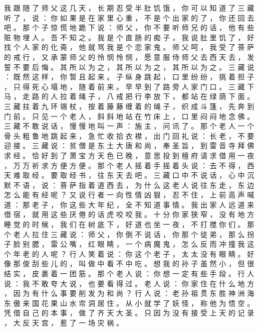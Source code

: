 {我 跟 随 了 师 父 这 几 天 ， 长 期 忍 受 半 肚 饥 饿 ， 你 可 以 知 道 了 三 藏 听 了 ， 说 ： 你 如 果 是 在 家 里 心 重 ， 不 是 个 出 家 的 了 ， 你 还 回 去 吧 。
那 个 子 惊 慌 地 跪 下 说 ： 师 父 ， 你 不 要 听 师 兄 的 话 ， 他 有 些 赃 物 埋 人 。
吾 不 知 之 。
我 是 个 直 肠 的 痴 子 ， 我 说 肚 里 饥 了 ， 好 找 个 人 家 的 化 斋 ， 他 就 骂 我 是 个 恋 家 鬼 。
师 父 呵 ， 我 受 了 菩 萨 的 戒 行 ， 又 承 蒙 师 父 的 怜 悯 怜 悯 ， 愿 意 服 侍 师 父 去 西 天 去 ， 发 誓 不 要 后 悔 。
其 所 以 为 之 ， 其 所 以 为 之 ， 其 所 以 为 之 。
三 藏 说 ： 既 然 这 样 ， 你 暂 且 起 来 。
子 纵 身 跳 起 ， 口 里 纷 纷 ， 挑 着 担 子 ， 只 得 死 心 塌 地 ， 随 着 前 来 。
早 早 到 了 路 旁 人 家 门 口 。
三 藏 下 马 ， 走 路 的 人 拉 着 绳 子 ， 八 戒 把 行 李 放 下 ， 都 站 在 绿 荫 下 面 。
三 藏 拄 着 九 环 锡 杖 ， 按 着 藤 藤 缠 着 的 绳 子 ， 织 成 斗 篷 ， 先 奔 到 门 前 。
只 见 一 个 老 人 ， 斜 斜 地 站 在 竹 床 上 ， 口 里 闷 闷 地 念 佛 。
三 藏 不 敢 说 话 ， 慢 慢 地 叫 一 声 ： 施 主 ， 问 讯 了 。
那 个 老 人 一 个 骨 头 粗 鲁 地 跳 起 来 ， 急 忙 收 拾 衣 襟 ， 出 门 回 礼 说 ： 长 老 ， 不 要 迎 接 。
三 藏 说 ： 贫 僧 是 东 土 大 唐 和 尚 ， 奉 圣 旨 ， 到 雷 音 寺 拜 佛 求 经 。
恰 好 到 了 萧 宝 方 天 色 已 晚 ， 意 思 投 到 檀 府 请 求 借 用 一 夜 ， 万 万 祈 求 方 便 方 便 。
那 个 老 人 摇 着 手 摇 着 头 说 ： 去 不 得 ， 西 天 难 取 经 。
要 取 经 书 ， 往 东 天 去 吧 。
三 藏 口 中 不 说 话 ， 心 中 沉 默 不 语 ， 说 ： 菩 萨 指 着 道 西 去 ， 为 什 么 这 老 人 说 往 东 走 ， 东 边 怎 么 能 有 经 呢 ？
又 说 行 者 一 向 性 情 凶 狠 ， 忍 不 住 ， 上 前 高 声 喊 道 ： 那 老 子 ， 你 这 些 大 年 纪 ， 全 不 知 道 事 情 。
我 出 家 人 远 道 来 借 宿 ， 就 用 这 些 厌 倦 的 话 虎 咬 咬 我 。
十 分 你 家 狭 窄 ， 没 有 地 方 睡 觉 的 时 候 ， 我 们 在 树 底 下 ， 好 道 也 坐 一 夜 ， 不 打 搅 你 们 。
那 个 老 人 拉 住 三 藏 说 ： 师 父 ， 你 倒 不 说 话 ， 你 那 个 徒 弟 ， 那 么 拐 子 脸 别 腮 ， 雷 公 嘴 ， 红 眼 睛 ， 一 个 病 魔 鬼 ， 怎 么 反 而 冲 撞 我 这 个 年 老 的 人 呢 ？ 行 人 笑 着 说 ： 你 这 个 老 子 ， 太 太 没 有 眼 睛 。
好 像 那 俊 刮 些 儿 的 ， 叫 做 中 看 不 中 吃 。
想 我 的 孙 子 虽 然 小 ， 但 很 结 实 ， 皮 裹 着 一 团 筋 。
那 个 老 人 说 ： 你 想 一 定 有 些 手 段 。
行 人 说 ： 我 不 敢 夸 大 说 ， 也 要 看 得 过 。
老 人 说 ： 你 家 住 在 什 么 地 方 ， 因 为 有 什 么 事 要 削 发 为 和 尚 ？ 行 人 说 ： 老 孙 祖 贯 东 胜 神 洲 海 东 傲 来 国 花 果 山 水 帘 洞 居 住 。
从 小 就 学 了 妖 怪 ， 称 他 为 悟 空 。
凭 借 自 己 的 本 事 ， 做 了 齐 天 大 圣 。
只 因 为 没 有 接 受 上 天 的 记 录 ， 大 反 天 宫 ， 惹 了 一 场 灾 祸 。
}
